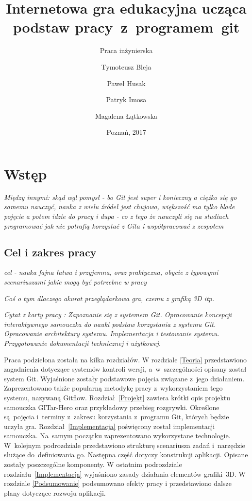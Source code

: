 \documentclass[12pt,a4paper,polish,thesis]{dcsbook}
\begin{document}
	\author{Tymoteusz Bleja \and Paweł Husak \and Patryk Imosa \and Magalena Łątkowska}
	\title{Internetowa gra edukacyjna ucząca podstaw pracy~z~programem~git}
	\subtitle{Praca inżynierska}
	\date{Poznań, 2017}
	\maketitle
	\frontmatter
	\tableofcontents{}
	\mainmatter

	\chapter{Wstęp}

	\textit{Między innymi:
	skąd wgl pomysł - bo Git jest super i konieczny a ciężko się go samemu nauczyć, nauka z wielu źródeł jest chujowa, większość ma tylko blade pojęcie a potem idzie do pracy i dupa - co z tego że nauczyli się na studiach programować jak nie potrafią korzystać z Gita i współpracować z zespołem}

	\section*{Cel i zakres pracy}

	\textit{cel - nauka fajna łatwa i przyjemna, oraz praktyczna, obycie z typowymi scenariuszami jakie mogą być potrzebne w pracy}

	\textit{Coś o tym dlaczego akurat przeglądarkowa gra, czemu z grafiką 3D itp.}

	\textit{Cytat z karty pracy : Zapoznanie się z systemem Git. Opracowanie koncepcji interaktywnego samouczka do nauki podstaw korzystania z systemu Git.  Opracowanie architektury systemu. Implementacja i testowanie systemu. Przygotowanie dokumentacji technicznej i użytkowej.}

	Praca podzielona została na kilka rozdziałów. W rozdziale \ref{Teoria} przedstawiono zagadnienia dotyczące systemów kontroli wersji, a~w~szczególności opisany został system Git. Wyjaśnione zostały podstawowe pojęcia związane z~jego działaniem. Zaprezentowano także popularną metodykę pracy z~wykorzystaniem tego systemu, nazywaną Gitflow. Rozdział~\ref{Projekt} zawiera krótki opis projektu samouczka GITar-Hero oraz przykładowy przebieg rozgrywki. Określone są~pojęcia i~terminy z~zakresu korzystania z~programu Git, których będzie uczyła gra. Rozdział~\ref{Implementacja} poświęcony został implementacji samouczka. Na~samym początku zaprezentowano wykorzystane technologie. W~kolejnym podrozdziale przedstawiono strukturę scenariusza zadań i~narzędzie służące do~definiowania go. Następna część dotyczy konstrukcji aplikacji. Opisane zostały poszczególne komponenty. W ostatnim podrozdziale rozdziału~\ref{Implementacja} wyjaśniono zasady działania elementów grafiki~3D. W rozdziale \ref{Podsumowanie} podsumowano efekty pracy i przedstawiono dalsze plany dotyczące rozwoju aplikacji.
\end{document}
